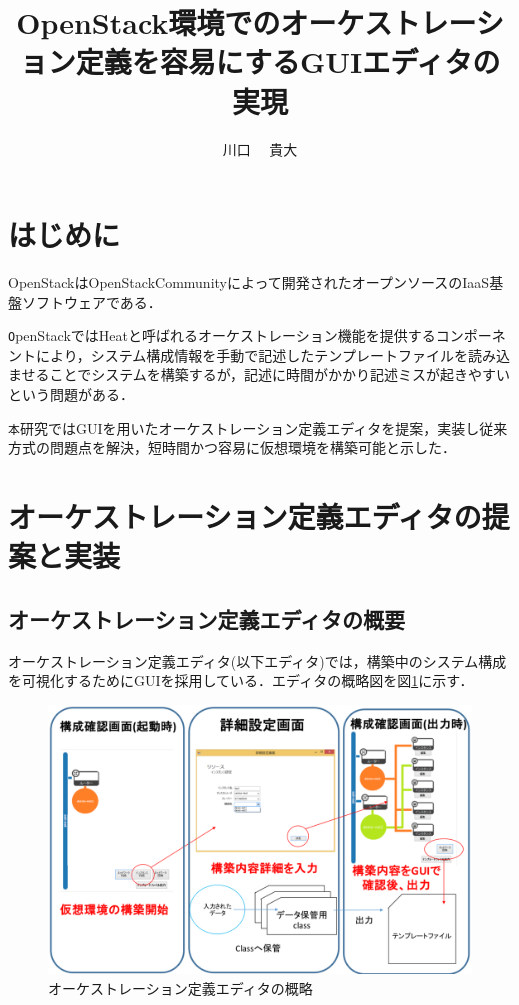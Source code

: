 \documentclass[a4j]{jarticle}
\title{OpenStack環境でのオーケストレーション定義を容易にするGUIエディタの実現}
\author{川口 ~~貴大}
\begin{document}
\begin{Abstract}
 
 \section{はじめに}
 OpenStackはOpenStackCommunityによって開発されたオープンソースのIaaS基盤ソフトウェアである．\cite{Document:1}
 
 \texttt OpenStackではHeatと呼ばれるオーケストレーション機能を提供するコンポーネントにより，システム構成情報を手動で記述したテンプレートファイルを読み込ませることでシステムを構築するが，記述に時間がかかり記述ミスが起きやすいという問題がある．
 
 \texttt 本研究ではGUIを用いたオーケストレーション定義エディタを提案，実装し従来方式の問題点を解決，短時間かつ容易に仮想環境を構築可能と示した．
 \section{オーケストレーション定義エディタの提案と実装}
 \subsection{オーケストレーション定義エディタの概要}
 オーケストレーション定義エディタ(以下エディタ)では，構築中のシステム構成を可視化するためにGUIを採用している．エディタの概略図を図\ref{graf:1}に示す．
 \begin{figure}[H]
 	\begin{center}
 		\vspace{-4mm}
 		\includegraphics[scale=0.27]{Document/GUIEditorOverview.eps}
 		\caption{オーケストレーション定義エディタの概略}
 		\label{graf:1}
 	\end{center}
 \end{figure}
 \vspace{-10mm}

\end{Abstract}
\end{document}
